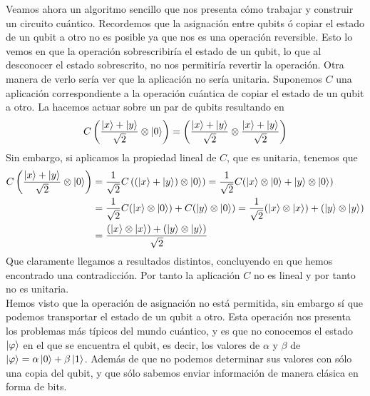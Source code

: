 \documentclass[a4paper]{article}
\numberwithin{equation}{section}
\begin{document}
Veamos ahora un algoritmo sencillo que nos presenta cómo trabajar y construir un circuito cuántico. Recordemos que la asignación entre qubits ó copiar el estado de un qubit a otro no es posible ya que nos es una operación reversible. Esto lo vemos en que la operación sobrescribiría el estado de un qubit, lo que al desconocer el estado sobrescrito, no nos permitiría revertir la operación. Otra manera de verlo sería ver que la aplicación no sería unitaria. Suponemos $C$ una aplicación correspondiente a la operación cuántica de copiar el estado de un qubit a otro. La hacemos actuar sobre un par de qubits resultando en
\begin{equation}
C\left(\frac{\ket{x}+\ket{y}}{\sqrt{2}} \otimes \ket{0}\right) = 
\left(\frac{\ket{x}+\ket{y}}{\sqrt{2}} \otimes \frac{\ket{x}+\ket{y}}{\sqrt{2}}\right)
\end{equation}
Sin embargo, si aplicamos la propiedad lineal de $C$, que es unitaria, tenemos que
\begin{equation}
\begin{split}
C\left(\frac{\ket{x}+\ket{y}}{\sqrt{2}} \otimes \ket{0}\right) 
&=
\frac{1}{\sqrt{2}}C\left((\ket{x}+\ket{y}) \otimes \ket{0}\right)
=
\frac{1}{\sqrt{2}} C(\ket{x}\otimes\ket{0} + \ket{y}\otimes\ket{0})
\\&=
\frac{1}{\sqrt{2}} C(\ket{x}\otimes\ket{0}) + C(\ket{y}\otimes\ket{0})
=
\frac{1}{\sqrt{2}} (\ket{x}\otimes\ket{x}) + (\ket{y}\otimes\ket{y})
\\&=
\frac{(\ket{x}\otimes\ket{x}) + (\ket{y}\otimes\ket{y})}{\sqrt{2}}
\end{split}
\end{equation}
Que claramente llegamos a resultados distintos, concluyendo en que hemos encontrado una contradicción. Por tanto la aplicación $C$ no es lineal y por tanto no es unitaria.\\
\linebreak
Hemos visto que la operación de asignación no está permitida, sin embargo sí que podemos transportar el estado de un qubit a otro. Esta operación nos presenta los problemas más típicos del mundo cuántico, y es que no conocemos el estado $\ket{\varphi}$ en el que se encuentra el qubit, es decir, los valores de $\alpha$ y $\beta$ de $\ket{\varphi} = \alpha\ket{0} + \beta\ket{1}$. Además de que no podemos determinar sus valores con sólo una copia del qubit, y que sólo sabemos enviar información de manera clásica en forma de bits.\\
\end{document}
